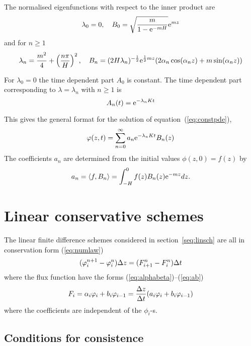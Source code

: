 The normalised eigenfunctions with respect to the inner product are
\begin{equation}
   \lambda_0 = 0, \quad B_0 = \sqrt{\frac{m}{1-\mathrm{e}^{-mH}}} \mathrm{e}^{mz}
\end{equation}
and for $n \ge 1$
\begin{equation}
   \lambda_n = \frac{m^2}{4} + \left(\frac{n \pi}{H}\right)^2, \quad
      B_n = (2 H \lambda_n)^{-\frac{1}{2}} \mathrm{e}^{\frac{1}{2} m z} 
            (2 \alpha_n \cos(\alpha_n z) + m \sin(\alpha_n z))
\end{equation}

For $\lambda_0 = 0$ the time dependent part $A_0$ is constant.
The time dependent part corresponding to $\lambda = \lambda_n$ with $n \ge
1$ is
\begin{equation}
   A_n(t) = \mathrm{e}^{-\lambda_n K t}
\end{equation}

This gives the general format for the solution of
equation~(\ref{eq:constpde}),
\begin{equation}
  \varphi(z,t) = \sum_{n=0}^\infty a_n \mathrm{e}^{-\lambda_n K t} B_n(z)
\end{equation}
The coefficients $a_n$ are determined from the initial values
$\phi(z,0) = f(z)$ by
\begin{equation}
   a_n = \langle f, B_n \rangle = \int_{-H}^0 f(z) B_n(z) \mathrm{e}^{-mz} dz .
\end{equation}


\section{Linear conservative schemes}\label{app:lincons}

The linear finite difference schemes considered in
section~\ref{seq:linsch} are all in conservation form (\ref{eq:numlaw})
\begin{equation}\label{eq:appflux}
    (\varphi_i^{n+1} - \varphi_i^n) \Delta z = (F_{i+1}^n - F_i^n) \Delta t 
\end{equation}
where the flux function have the forms (\ref{eq:alphabeta})--(\ref{eq:ab})
\begin{equation}\label{eq:applin}
   F_i = \alpha_i \varphi_i + b_i \varphi_{i-1}
       = \frac{\Delta z}{\Delta t} ( a_i \varphi_i + b_i \varphi_{i-1} )
\end{equation}
where the coefficients are independent of the $\phi_i$-s.

\subsection{Conditions for consistence}

